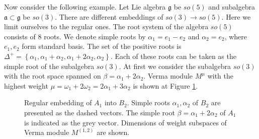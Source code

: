\documentclass[12pt]{article}
\theoremstyle{definition}
\newcommand{\gf}{\mathfrak{g}}
\newcommand{\af}{\mathfrak{a}}
\begin{document}
Now consider the following example. 
Let Lie algebra $\gf$ be $so(5)$ and subalgebra $\af\subset \gf$ be $so(3)$. There are different embeddings of $so(3)\to so(5)$. Here we limit ourselves to the regular ones. 
The root system of the algebra $so(5)$ consists of 8 roots. We denote simple roots by $\alpha_{1}=e_{1}-e_{2}$ and $\alpha_{2}=e_{2}$, where $e_{1},e_{2}$ form standard basis. The set of the positive roots is $\Delta^{+}=\left\{\alpha_{1}, \alpha_{1}+\alpha_{2}, \alpha_{1}+2\alpha_{2}, \alpha_{2}\right\}$. Each of these roots can be taken as the simple root of the subalgebra $so(3)$. At first we consider the subalgebra $so(3)$ with the root space spanned on $\beta=\alpha_{1}+2\alpha_{2}$. Verma module $M^{\mu}$ with the highest weight $\mu=\omega_{1}+2\omega_{2}=2\alpha_{1}+3\alpha_{2}$ is shown at Figure \ref{fig:B2_Verma}.
\begin{figure}[h!bt]
  \noindent{}
  \caption{Regular embedding of $A_1$ into $B_2$. Simple roots $\alpha_1, \alpha_2$ of $B_2$ are presented as the dashed vectors.
    The simple root $\beta = \alpha_1+2\alpha_2$ of $A_1$ is indicated as the grey vector. Dimensions of weight subspaces of Verma module $M^{(1,2)}$ are shown.}
  
  \label{fig:B2_Verma}
\end{figure}
\end{document}

